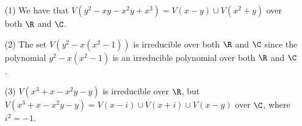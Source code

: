 \begin{example}\label{example_1.14}
    \begin{enumerate}
        \item[(1)] We have that $V(y^2-xy-x^2y+x^3)=V(x-y) \cup V(x^2+y)$ over
            both $\R$ and $\C$.

        \item[(2)] The set $V(y^2-x(x^2-1))$ is irreducible over both $\R$ and
            $\C$ since the polynomial  $y^2-x(x^2-1)$ is an irreducible
            polynomial over both $\R$ and  $\C$.

        \item[(3)] $V(x^3+x-x^2y-y)$ is irreducible over $\R$, but
            $V(x^3+x-x^2y-y)=V(x-i) \cup V(x+i) \cup V(x-y)$ over $\C$, where
            $i^2=-1$.
    \end{enumerate}
\end{example}
